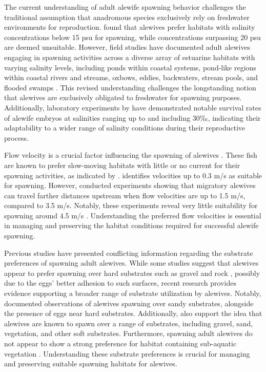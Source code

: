\documentclass[
]{book}
\begin{document}
The current understanding of adult alewife spawning behavior challenges the traditional assumption that anadromous species exclusively rely on freshwater environments for reproduction. \citet{brown_habitat_2000} found that alewives prefer habitats with salinity concentrations below 15 psu for spawning, while concentrations surpassing 20 psu are deemed unsuitable. However, field studies have documented adult alewives engaging in spawning activities across a diverse array of estuarine habitats with varying salinity levels, including ponds within coastal systems, pond-like regions within coastal rivers and streams, oxbows, eddies, backwaters, stream pools, and flooded swamps \citep{pardue_habitat_1983, mullen_species_1986, collette_fishes_2003, walsh_early_2005}. This revised understanding challenges the longstanding notion that alewives are exclusively obligated to freshwater for spawning purposes. Additionally, laboratory experiments by \citet{dimaggio_spawning_2015} have demonstrated notable survival rates of alewife embryos at salinities ranging up to and including 30‰, indicating their adaptability to a wider range of salinity conditions during their reproductive process.

Flow velocity is a crucial factor influencing the spawning of alewives \citep{tommasi_effect_2015}. These fish are known to prefer slow-moving habitats with little or no current for their spawning activities, as indicated by \citet{walsh_early_2005}. \citet{pardue_habitat_1983} identifies velocities up to 0.3 m/s as suitable for spawning. However, \citet{haro_swimming_2004} conducted experiments showing that migratory alewives can travel farther distances upstream when flow velocities are up to 1.5 m/s, compared to 3.5 m/s. Notably, these experiments reveal very little suitability for spawning around 4.5 m/s \citep{haro_swimming_2004}. Understanding the preferred flow velocities is essential in managing and preserving the habitat conditions required for successful alewife spawning.

Previous studies have presented conflicting information regarding the substrate preferences of spawning adult alewives. While some studies suggest that alewives appear to prefer spawning over hard substrates such as gravel and rock \citep[\citet{brown_habitat_2000}]{pardue_habitat_1983}, possibly due to the eggs' better adhesion to such surfaces, recent research provides evidence supporting a broader range of substrate utilization by alewives. Notably, \citet{able_alewife_2020} documented observations of alewives spawning over sandy substrates, alongside the presence of eggs near hard substrates. Additionally, \citet{oconnell_spawning_1997} also support the idea that alewives are known to spawn over a range of substrates, including gravel, sand, vegetation, and other soft substrates. Furthermore, spawning adult alewives do not appear to show a strong preference for habitat containing sub-aquatic vegetation \citep{killgore_distribution_1988, rozas_rosubmerged_1988}. Understanding these substrate preferences is crucial for managing and preserving suitable spawning habitats for alewives.
\end{document}
